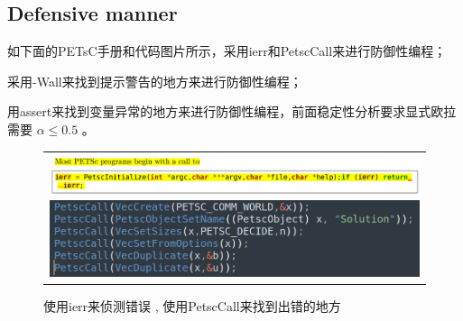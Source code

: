 \documentclass[3p]{elsarticle}
\numberwithin{equation}{section}
\begin{document}
    \subsection{Defensive manner}
    
    如下面的PETsC手册和代码图片所示，采用ierr和PetscCall来进行防御性编程；
    
    采用-Wall来找到提示警告的地方来进行防御性编程；
    
    用assert来找到变量异常的地方来进行防御性编程，前面稳定性分析要求显式欧拉需要 $ \alpha \le 0.5 $ 。 
    
    \begin{figure}[h]
    	\begin{center}
    		\begin{tabular}{c}
    			\includegraphics[angle=0, scale=0.16]{./figures/ierr.png}
    			\includegraphics[angle=0, scale=0.20]{./figures/petsccall.png}
    		\end{tabular}
    	\end{center}
    	\caption{使用ierr来侦测错误 , 使用PetscCall来找到出错的地方}
    	\label{fig:illustration-ierr}
    \end{figure}
        
\end{document}
